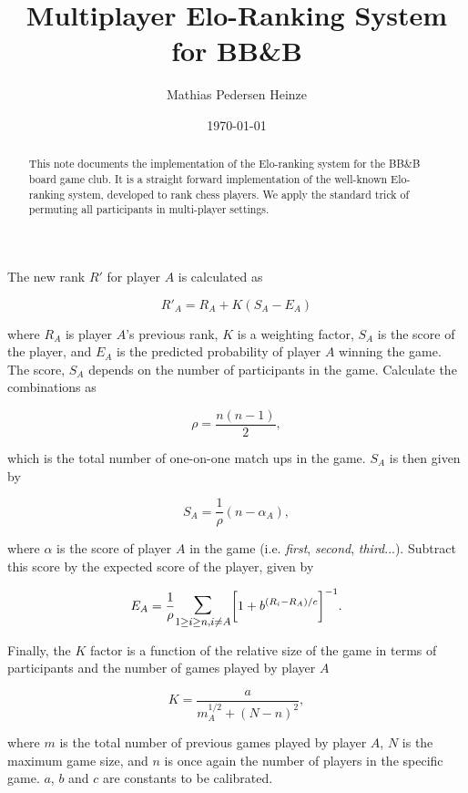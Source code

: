 \documentclass[12pt]{article}
\begin{document}
\title{Multiplayer Elo-Ranking System for BB\&B}
\author{Mathias Pedersen Heinze}
\date{\today}
\maketitle

\begin{abstract}
	This note documents the implementation of the Elo-ranking system for the BB\&B board game club. It is a straight forward implementation of the well-known Elo-ranking system, developed to rank chess players. We apply the standard trick of permuting all participants in multi-player settings.
\end{abstract}
\vspace{20pt}

The new rank $R'$ for player $A$ is calculated as

\begin{equation}
	R'_A=R_A+K(S_A-E_A)
\end{equation}

where $R_A$ is player $A$'s previous rank, $K$ is a weighting factor, $S_A$ is the score of the player, and $E_A$ is the predicted probability of player $A$ winning the game. The score, $S_A$ depends on the number of participants in the game. Calculate the combinations as

\begin{equation}
	\rho=\frac{n(n-1)}{2},
\end{equation}

which is the total number of one-on-one match ups in the game. $S_A$ is then given by

\begin{equation}
	S_A=\frac{1}{\rho}(n-\alpha_A),
\end{equation}

where $\alpha$ is the score of player $A$ in the game (i.e. \textit{first}, \textit{second}, \textit{third}...). Subtract this score by the expected score of the player, given by

\begin{equation}
	E_A=\frac{1}{\rho}\mathlarger{\mathlarger{\sum}}_{1\geq i \geq n,i\ne A}\bigg[1+b^{(R_i-R_A)/c}\bigg]^{-1}.
\end{equation}

Finally, the $K$ factor is a function of the relative size of the game in terms of participants and the number of games played by player $A$

\begin{equation}
	K=\frac{a}{m_A^{1/2}+(N-n)^2},
\end{equation}

where $m$ is the total number of previous games played by player $A$, $N$ is the maximum game size, and $n$ is once again the number of players in the specific game. $a$, $b$ and $c$ are constants to be calibrated.
\end{document}
